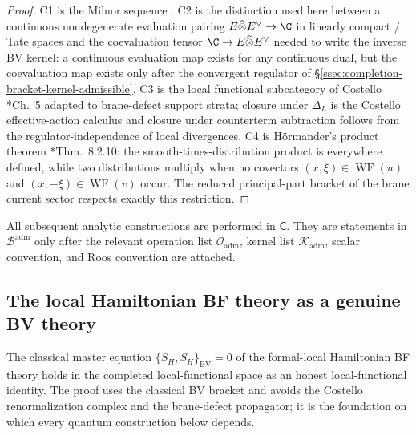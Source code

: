 \begin{proof}
C1 is the Milnor sequence
\cite{milnor-axiomatic-homology}.  C2 is the distinction used here
between a continuous nondegenerate evaluation pairing
\(E\widehat\otimes E^\vee\to\C\) in linearly compact / Tate spaces and
the coevaluation tensor \(\C\to E\widehat\otimes E^\vee\) needed to
write the inverse BV kernel: a continuous evaluation map exists for any
continuous dual, but the coevaluation map exists only after the
convergent regulator of
\S\ref{ssec:completion-bracket-kernel-admissible}.  C3 is the local
functional subcategory of Costello \cite{costello-renormalization}*{Ch.~5}
adapted to brane-defect support strata; closure under \(\Delta_L\) is
the Costello effective-action calculus and closure under counterterm
subtraction follows from the regulator-independence of local
divergences.  C4 is H\"ormander's product theorem
\cite{hormander-vol1}*{Thm.~8.2.10}: the smooth-times-distribution
product is everywhere defined, while two distributions multiply when no
covectors \((x,\xi)\in\operatorname{WF}(u)\) and
\((x,-\xi)\in\operatorname{WF}(v)\) occur.  The reduced
	principal-part bracket of the brane current sector respects exactly this
	restriction.
\end{proof}

All subsequent analytic constructions are performed in \(\mathsf C\).
They are statements in \(\mathcal B^{\mathrm{adm}}\) only after the
relevant operation list \(\mathcal O_{\mathrm{adm}}\), kernel list
\(\mathcal K_{\mathrm{adm}}\), scalar convention, and Roos convention are
attached.

\subsection{The local Hamiltonian BF theory as a genuine BV theory}
\label{ssec:completion-bv-theorem}

The classical master equation \(\{S_H,S_H\}_{\mathrm{BV}}=0\) of the
formal-local Hamiltonian BF theory holds in the completed
local-functional space as an honest local-functional identity.  The proof
uses the classical BV bracket and avoids the Costello renormalization complex and the
brane-defect propagator; it is the foundation on which every quantum
construction below depends.

